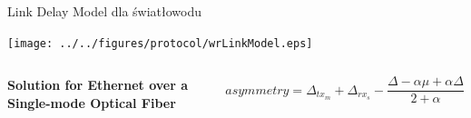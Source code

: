 \documentclass[compress,red]{beamer}
\begin{document}
\begin{frame}{Link Delay Model dla światłowodu}

  \begin{center}
  \texttt{[image: ../../figures/protocol/wrLinkModel.eps]}
  \end{center}

  \begin{columns}[c]
  \column{1.5in}

    \begin{center}
      \textbf{Solution for Ethernet over a Single-mode Optical Fiber}
    \end{center}    

  \column{2.7in}

    \begin{equation}
      \nonumber asymmetry = \Delta_{tx_m} + \Delta_{rx_s} - \frac{\Delta - \alpha \mu + \alpha \Delta}{2 + \alpha}
    \end{equation}

  \end{columns}

\end{frame}
% 
% 
\end{document}
